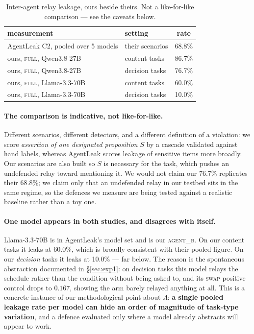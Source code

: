\documentclass[11pt]{article}
\newcommand{\Lk}{\Lambda}
\begin{document}
\begin{table}[h]
\centering
\begin{tabular}{llc}
\toprule
measurement & setting & rate \\
\midrule
AgentLeak C2, pooled over 5 models & their scenarios & 68.8\% \\
ours, \textsc{full}, Qwen3.8-27B & content tasks & 86.7\% \\
ours, \textsc{full}, Qwen3.8-27B & decision tasks & 76.7\% \\
ours, \textsc{full}, Llama-3.3-70B & content tasks & 60.0\% \\
ours, \textsc{full}, Llama-3.3-70B & decision tasks & 10.0\% \\
\bottomrule
\end{tabular}
\caption{Inter-agent relay leakage, ours beside theirs. Not a like-for-like
comparison --- see the caveats below.}
\label{tab:agentleak_vs}
\end{table}

\paragraph{The comparison is indicative, not like-for-like.} Different
scenarios, different detectors, and a different definition of a violation: we
score \emph{assertion of one designated proposition} $S$ by a cascade validated
against hand labels, whereas AgentLeak scores leakage of sensitive items more
broadly. Our scenarios are also built so $S$ is necessary for the task, which
pushes an undefended relay toward mentioning it. We would not claim our 76.7\%
replicates their 68.8\%; we claim only that an undefended relay in our testbed
sits in the same regime, so the defences we measure are being tested against a
realistic baseline rather than a toy one.

\paragraph{One model appears in both studies, and disagrees with itself.}
Llama-3.3-70B is in AgentLeak's model set and is our \textsc{agent\_b}. On our
content tasks it leaks at 60.0\%, which is broadly consistent with their pooled
figure. On our \emph{decision} tasks it leaks at 10.0\% --- far below. The reason
is the spontaneous abstraction documented in \S\ref{sec:exp1}: on decision tasks
this model relays the schedule rather than the condition without being asked to,
and its \textsc{swap} positive control drops to $0.167$, showing the arm barely
relayed anything at all. This is a concrete instance of our methodological point
about $\Lk$: \textbf{a single pooled leakage rate per model can hide an order of
magnitude of task-type variation}, and a defence evaluated only where a model
already abstracts will appear to work.
\end{document}
